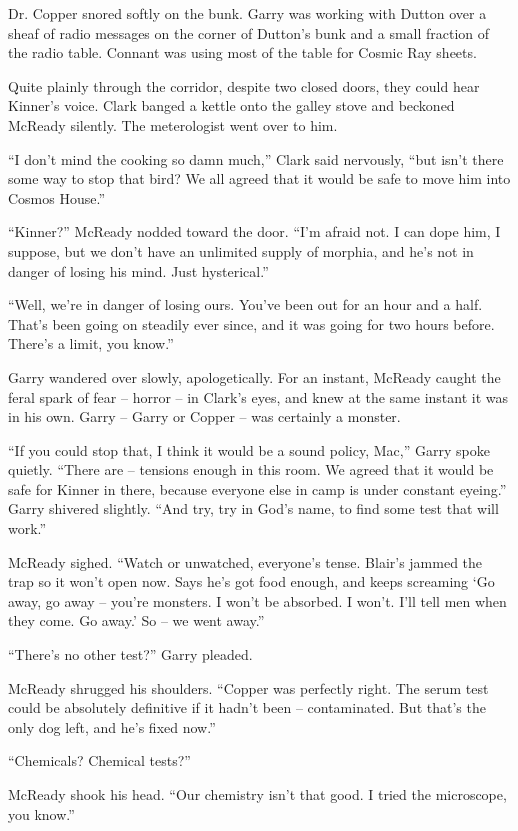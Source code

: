 \documentclass[letterpaper,openany,12pt]{memoir}		%
\begin{document}
Dr. Copper snored softly on the bunk. Garry was working with Dutton over a sheaf
of radio messages on the corner of Dutton's bunk and a small fraction of the
radio table. Connant was using most of the table for Cosmic Ray sheets.

Quite plainly through the corridor, despite two closed doors, they could hear
Kinner's voice. Clark banged a kettle onto the galley stove and beckoned McReady
silently. The meterologist went over to him.

``I don't mind the cooking so damn much,'' Clark said nervously, ``but isn't
there some way to stop that bird? We all agreed that it would be safe to move
him into Cosmos House.''

``Kinner?'' McReady nodded toward the door. ``I'm afraid not. I can dope him, I
suppose, but we don't have an unlimited supply of morphia, and he's not in
danger of losing his mind. Just hysterical.''

``Well, we're in danger of losing ours. You've been out for an hour and a half.
That's been going on steadily ever since, and it was going for two hours before.
There's a limit, you know.''

Garry wandered over slowly, apologetically. For an instant, McReady caught the
feral spark of fear -- horror -- in Clark's eyes, and knew at the same instant
it was in his own. Garry -- Garry or Copper -- was certainly a monster.

``If you could stop that, I think it would be a sound policy, Mac,'' Garry spoke
quietly. ``There are -- tensions enough in this room. We agreed that it would be
safe for Kinner in there, because everyone else in camp is under constant
eyeing.'' Garry shivered slightly. ``And try, try in God's name, to find some
test that will work.''

McReady sighed. ``Watch or unwatched, everyone's tense. Blair's jammed the trap
so it won't open now. Says he's got food enough, and keeps screaming `Go away,
go away -- you're monsters. I won't be absorbed. I won't. I'll tell men when
they come. Go away.' So -- we went away.''

``There's no other test?'' Garry pleaded.

McReady shrugged his shoulders. ``Copper was perfectly right. The serum test
could be absolutely definitive if it hadn't been -- contaminated. But that's the
only dog left, and he's fixed now.''

``Chemicals? Chemical tests?''

McReady shook his head. ``Our chemistry isn't that good. I tried the microscope,
you know.''
\end{document}
